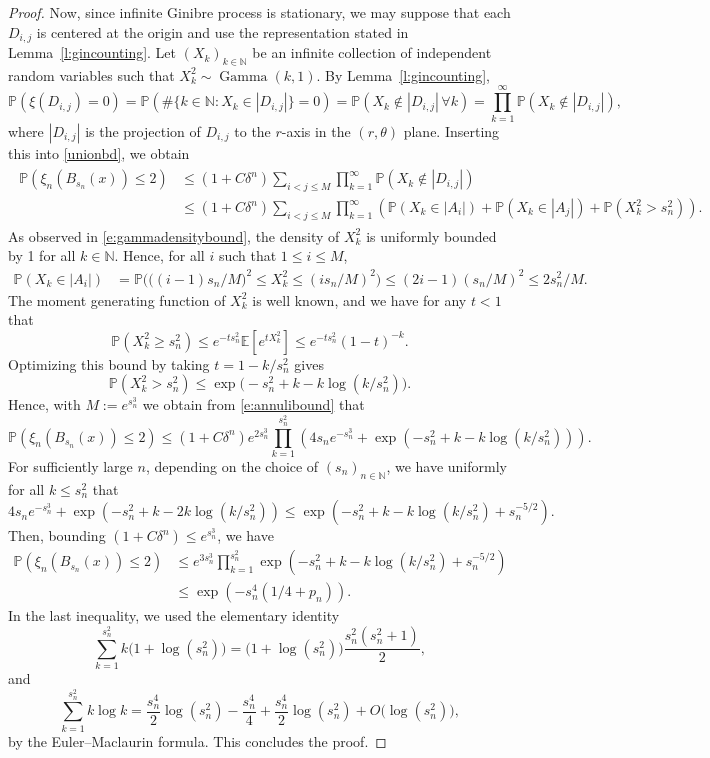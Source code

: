 \documentclass{amsart}
\theoremstyle{plain}
\theoremstyle{definition}
\theoremstyle{remark}
\def\E{\mathbb E}
\def\P{\mathbb P}
\begin{document}
\begin{proof}
Now, since infinite Ginibre process is stationary, we may suppose that each $D_{i,j}$ is centered at the origin and use the representation  stated in Lemma~\ref{l:gincounting}. Let $(X_k)_{k \in \mathbb{N} }$ be an infinite collection of independent random variables such that $X^2_k\sim \operatorname{Gamma}(k,1)$. By Lemma~\ref{l:gincounting},
\[
\P( \xi ( D_{i,j} ) = 0)  = \P(  \#\{ k \in \mathbb N : X_{k} \in |D_{i,j} | \} =0 ) =  \P (  X_{k} \notin |D_{i,j}| \, \forall k ) =\prod_{k=1}^\infty \P( X_{k} \notin |D_{i,j}|) ,
\]
where $|D_{i,j}|$ is the projection of $D_{i,j}$ to the $r$-axis in the $(r,\theta)$ plane. Inserting this into \eqref{unionbd}, we obtain 
\begin{align}
\begin{split}
\label{e:annulibound}
	\P ( \xi_n ( B_{s_n} (x)) \le 2)
	&\le (1+C\delta^n) \sum_{i < j \le M} 
	\prod_{k=1}^\infty \P( X_{k} \notin |D_{i,j}|)\\
	&\le 
	(1+C\delta^n) \sum_{i < j \le M} 
	\prod_{k=1}^\infty
	\left( \P(X_{k} \in |A_i|) +  \P(X_{k} \in |A_j|) +\P(X^2_{k} > s_n^2) \right).
\end{split}
\end{align}
As observed in \eqref{e:gammadensitybound}, the density of $X^2_{k}$ is uniformly bounded by 1 for all $k \in \mathbb N$. Hence, for all $i$ such that $1 \le i \le M$, 
\begin{align*}
	\P(X_{k}  \in |A_i|)&=\P\Big( \big((i-1)s_n/M\big)^2\le  X^2_{k} \le (is_n/M)^2\Big) \le 
	(2i-1) (s_n/M)^2\le 2s_n^2/M.
\end{align*}
The moment generating function of $X^2_{k}$ is well known, and we have for any $t < 1$ that 
\[
\P( X^2_{k} \ge s_n^2) \le e^{ - t s_n^2} \E [ e^{ t X^2_{k}} ] \le e^{ - t s_n^2}  ( 1 -  t)^{-k}.
\]
Optimizing this bound by taking $t = 1 -  k/s_n^2$ gives 
\[\P(X^2_{k} > s_n^2)\le \exp\big(-s_n^2 +k - k\log ( k/s_n^2)\big).\] 
Hence, with $M:=e^{s_n^3}$ we obtain from \eqref{e:annulibound} that 
\[
\P ( \xi_n ( B_{s_n} (x)) \le 2) \le 
(1+C \delta^n) e^{2 s^3_n} \prod_{k=1}^{s_n^2 } \left ( 4 s_n e^{ - s_n^3}  +  \exp\left(-s_n^2+k-  k\log ( k /s_n^2)\right) \right).
\]
For sufficiently large $n$, depending on the choice of  $(s_n)_{n \in \mathbb N}$, we have  uniformly for all $k \le s_n^2$ that
\[
4 s_n e^{ - s_n^3}  +  \exp\left(-s_n^2+k-2k\log (k /s_n^2)\right) \le  \exp\left(- s_n^2 +k - k\log (k /s_n^2) +s_n^{-5/2}\right).
\]
 Then, bounding $(1 + C \delta^n) \le e^{s_n^3}$, we have 
\begin{align*}
\P ( \xi_n ( B_{s_n} (x)) \le 2) &\le
	e^{3 s^3_n} \prod_{k=1}^{s_n^2} 
	\exp\left(-s_n^2 + k - k\log (k /s_n^2)+s_n^{-5/2}\right) \\
	& \le \exp\left(- s^4_n ( 1/4 + p_n ) \right).
\end{align*}
In the last inequality, we used the elementary identity
\[
\sum_{k=1}^{s_n^2}   k \big(1 +   \log (s^2_n)  \big)  
 =
\big(1 +   \log (s^2_n)  \big)    \frac{ s_n^2  (s_n^2 + 1 ) }{2}, 
\]
and 
\[
\sum_{k=1}^{s_n^2}   k \log k   = \frac{ s_n^4}{2} \log(s_n^2)  - \frac{ s_n^4}{4} + \frac{s_n^4 }{2} \log (s_n^2) + O\big ( \log (s_n^2)\big),
\]
by the Euler--Maclaurin formula. 
This concludes the proof.
\end{proof}
\end{document}
